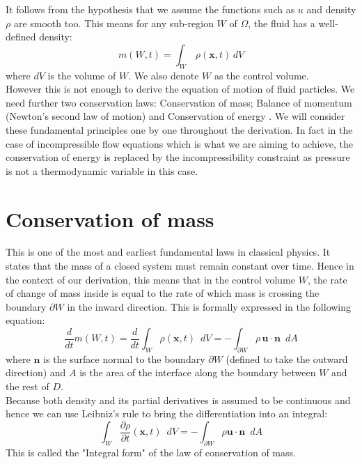 It follows from the hypothesis that we assume the functions such as $u$ and density $\rho$ are smooth too. This means for any sub-region $W$ of $\Omega$, the fluid has a well-defined density:
\begin{equation}
m(W,t) = \int_W\,\rho(\textbf{x},t)\,dV
\end{equation}
where $dV$ is the volume of $W$. We also denote $W$ as the control volume.\\

However this is not enough to derive the equation of motion of fluid particles. We need further two conservation laws:
Conservation of mass; Balance of momentum (Newton's second law of motion) and Conservation of energy \cite{chorin1990mathematical}. We will consider these fundamental principles one by one throughout the derivation. In fact in the case of incompressible flow equations which is what we are aiming to achieve, the conservation of energy is replaced by the incompressibility constraint as pressure is not a thermodynamic variable in this case.

\section{Conservation of mass}
This is one of the most and earliest fundamental laws in classical physics. It states that the mass of a closed system must remain constant over time. Hence in the context of our derivation, this means that in the control volume $W$, the rate of change of mass inside is equal to the rate of which mass is crossing the boundary $\partial W$ in the inward direction. This is formally expressed in the following equation:\\

\begin{equation}
\dfrac{d}{dt} m(W, t) = \dfrac{d}{d t} \int_W \rho (\textbf{x}, t) \, \, \, dV = - \int_{\partial W} \rho \,\textbf{u} \cdot \textbf{n} \, \, \, dA
\end{equation}
where $\textbf{n}$ is the surface normal to the boundary $\partial W$ (defined to take the outward direction) and $A$ is the area of the interface along the boundary between $W$ and the rest of $D$.\\

Because both density and its partial derivatives is assumed to be continuous and hence we can use Leibniz's rule to bring the differentiation into an integral:
\begin{equation}
\int_W \dfrac{\partial \rho}{\partial t} (\textbf{x}, t) \, \, \, dV = - \int_{\partial W} \rho \textbf{u} \cdot \textbf{n} \, \, \, dA
\end{equation}
This is called the "Integral form" of the law of conservation of mass.\\

